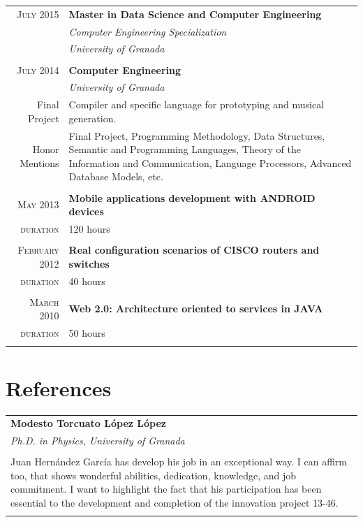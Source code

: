 \documentclass[a4paper,10pt]{article} %
\newcommand{\duration}{\textcolor{skillscolor}{\textsc{duration}}}
\newcommand{\fproject}{\textcolor{skillscolor}{Final Project}}
\newcommand{\hmentions}{\textcolor{skillscolor}{Honor Mentions}}
\begin{document}
\begin{tabular}{r|p{11cm}}

\textsc{July 2015} & \textbf{Master in Data Science and Computer Engineering} \\
                   & \emph{Computer Engineering
Specialization}\\
& \emph{University of Granada} \\
\multicolumn{2}{c}{} \\

\textsc{July} 2014 & \textbf{Computer Engineering} \\
 & \emph{University of Granada}\\ 
 \fproject & Compiler and specific language for prototyping and musical
generation.\\ 
\hmentions & Final Project, Programming Methodology, Data Structures,
Semantic and Programming Languages, Theory of the Information and Communication, Language
Processors, Advanced Database Models, etc.\\
\multicolumn{2}{c}{} \\

\textsc{May} 2013 & \textbf{Mobile applications development with ANDROID
devices}\\
\duration & 120 hours \\
\multicolumn{2}{c}{} \\

\textsc{February} 2012 & \textbf{Real configuration scenarios of CISCO routers
and switches}\\
\duration & 40 hours \\
\multicolumn{2}{c}{} \\

\textsc{March} 2010 & \textbf{Web 2.0: Architecture oriented to services in
JAVA}\\
\duration & 50 hours\\
\multicolumn{2}{c}{} \\
\end{tabular}

\section{References}

\begin{tabular}{p{146mm}}

\textbf{Modesto Torcuato López López} \\
\emph{Ph.D. in Physics, University of Granada}\\ \\
Juan Hernández García has develop his job in an exceptional way. I can affirm
too, that shows wonderful abilities, dedication, knowledge, and job commitment.
I want to highlight the fact that his participation has been essential to the
development and completion of the innovation project 13-46. \\
\multicolumn{1}{c}{}
\end{tabular}
\end{document}
